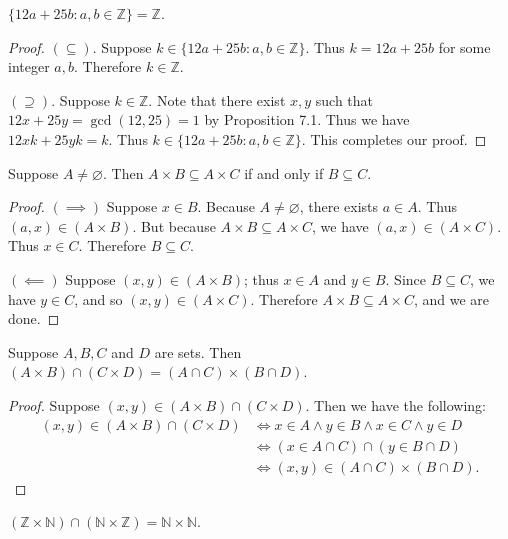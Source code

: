 \documentclass{exam}
\begin{document}
\begin{proposition}{8.28}
    $\{12a + 25b:a,b\in\mathbb Z\}=\mathbb Z$.
\end{proposition}

\begin{proof}
    $(\subseteq)$. Suppose $k\in\{12a+25b:a,b\in\mathbb Z\}$. Thus $k=12a+25b$ for some integer $a, b$. Therefore $k\in\mathbb Z$.

    $(\supseteq)$. Suppose $k\in\mathbb Z$. Note that there exist $x,y$ such that $12x + 25y=\gcd(12, 25) = 1$ by Proposition 7.1. Thus we have $12xk + 25yk = k$. Thus $k\in\{12a + 25b:a,b\in\mathbb Z\}$. This completes our proof.
\end{proof}

\begin{proposition}{8.29}
    Suppose $A\neq\varnothing$. Then $A\times B\subseteq A\times C$ if and only if $B\subseteq C$.
\end{proposition}

\begin{proof}
    $(\implies)$ Suppose $x\in B$. Because $A\neq\varnothing$, there exists $a\in A$. Thus $(a, x)\in(A\times B)$. But because $A\times B\subseteq A\times C$, we have $(a, x)\in(A\times C)$. Thus $x\in C$. Therefore $B\subseteq C$.

    $(\impliedby)$ Suppose $(x, y)\in(A\times B)$; thus $x\in A$ and $y\in B$. Since $B\subseteq C$, we have $y\in C$, and so $(x, y)\in (A\times C)$. Therefore $A\times B\subseteq A\times C$, and we are done.
\end{proof}

\begin{lemma}{8.1}
    Suppose $A, B, C$ and $D$ are sets. Then $(A\times B)\cap(C\times D)=(A\cap C)\times(B\cap D)$.
\end{lemma}

\begin{proof}
    Suppose $(x, y) \in (A\times B)\cap(C\times D)$. Then we have the following:
    \begin{align*}
        (x, y) \in (A\times B)\cap(C\times D)&\iff x\in A\land y \in B\land x\in C\land y\in D\\
        &\iff (x\in A\cap C)\cap(y\in B\cap D)\\
        &\iff (x, y)\in (A\cap C)\times(B\cap D).
    \end{align*}
\end{proof}

\begin{proposition}{8.30}
    $(\mathbb Z\times\mathbb N)\cap(\mathbb N\times \mathbb Z) = \mathbb N\times \mathbb N$.
\end{proposition}
\end{document}
